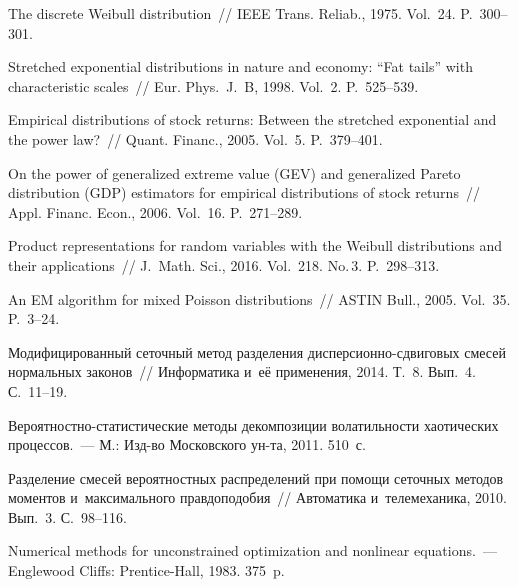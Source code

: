 \begin{multicols}{2}
{{\begin{thebibliography}{99}
     The discrete Weibull distribution~// IEEE
    Trans. Reliab., 1975. Vol.~24. P.~300--301.
    
    Stretched exponential distributions in nature and economy: ``Fat
    tails'' with characteristic scales~// Eur. Phys.~J.~B,
    1998. Vol.~2. P.~525--539.
    
    Empirical distributions of stock returns: Between the
    stretched exponential and the power law?~// Quant. Financ.,
    2005. Vol.~5. P.~379--401.
    
    On the power of generalized extreme value (GEV) and
    generalized Pareto distribution (GDP) estimators for empirical
    distributions of stock returns~// Appl. Financ. Econ., 2006.
    Vol.~16. P.~271--289.
    
 Product representations for random variables with
    the Weibull distributions and their applications~// J.~Math. Sci., 
    2016. Vol.~218. No.\,3. P.~298--313.
    
 An EM algorithm for mixed Poisson distributions~// ASTIN
    Bull., 2005. Vol.~35. P.~3--24.
    
     Модифицированный сеточный метод
    разделения дис\-пер\-си\-он\-но-сдви\-го\-вых смесей нормальных законов~//
    Информатика и~её применения, 2014. Т.~8. Вып.~4. С.~11--19.
    
 Вероятностно-статистические методы декомпозиции
    волатильности хаотических процессов.~--- М.: Изд-во Московского
    ун-та, 2011. 510~с.
    
 Разделение смесей вероятностных
    распределений при помощи сеточных методов моментов и~максимального
    правдоподобия~// Автоматика и~телемеханика, 2010. Вып.~3. С.~98--116.
    
 Numerical methods for unconstrained
    optimization and nonlinear equations.~--- Englewood Cliffs:
    Prentice-Hall, 1983. 375~p.
 \end{thebibliography}

 }
 }

\end{multicols}

